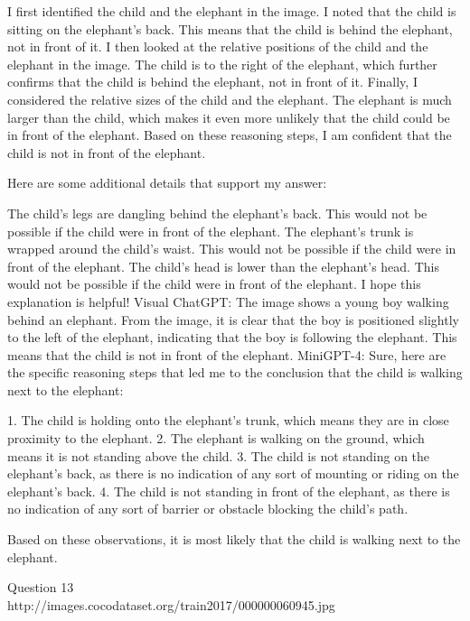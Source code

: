\begin{enumerate}
        I first identified the child and the elephant in the image.
        I noted that the child is sitting on the elephant's back. This means that the child is behind the elephant, not in front of it.
        I then looked at the relative positions of the child and the elephant in the image. The child is to the right of the elephant, which further confirms that the child is behind the elephant, not in front of it.
        Finally, I considered the relative sizes of the child and the elephant. The elephant is much larger than the child, which makes it even more unlikely that the child could be in front of the elephant.
        Based on these reasoning steps, I am confident that the child is not in front of the elephant.

        Here are some additional details that support my answer:

        The child's legs are dangling behind the elephant's back. This would not be possible if the child were in front of the elephant.
        The elephant's trunk is wrapped around the child's waist. This would not be possible if the child were in front of the elephant.
        The child's head is lower than the elephant's head. This would not be possible if the child were in front of the elephant.
        I hope this explanation is helpful!
        \subitem Visual ChatGPT: The image shows a young boy walking behind an elephant. From the image, it is clear that the boy is positioned slightly to the left of the elephant, indicating that the boy is following the elephant. This means that the child is not in front of the elephant.
        \subitem MiniGPT-4: Sure, here are the specific reasoning steps that led me to the conclusion that the child is walking next to the elephant:

        1. The child is holding onto the elephant’s trunk, which means they are in close proximity to the elephant.
        2. The elephant is walking on the ground, which means it is not standing above the child.
        3. The child is not standing on the elephant’s back, as there is no indication of any sort of mounting or riding on the elephant’s back.
        4. The child is not standing in front of the elephant, as there is no indication of any sort of barrier or obstacle blocking the child’s path.
        
        Based on these observations, it is most likely that the child is walking next to the elephant.
    \end{enumerate}
Question 13\\
http://images.cocodataset.org/train2017/000000060945.jpg
